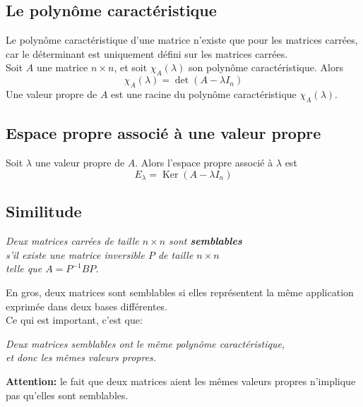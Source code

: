 \documentclass{article}
\numberwithin{equation}{section}
\newcommand\defn{\vspace{4px}\noindent \quad {\large \underline{\textsc{Définition }}: }}
\DeclareMathOperator{\ke}{Ker}
\begin{document}
\subsection{Le polynôme caractéristique}
Le polynôme caractéristique d'une matrice n'existe que pour les matrices carrées, car le déterminant est uniquement défini sur les matrices carrées. \\
Soit \(A\) une matrice \(n \times n\), et soit \(\chi_A(\lambda)\) son polynôme caractéristique. Alors
\begin{equation}
	\chi_A(\lambda) = \det(A-\lambda I_n)
\end{equation}
Une valeur propre de \(A\) est une racine du polynôme caractéristique \(\chi_A(\lambda)\). 

\subsection{Espace propre associé à une valeur propre}
Soit \(\lambda\) une valeur propre de \(A\). Alors l'espace propre associé à \(\lambda\) est
\begin{equation}
	E_\lambda = \ke(A-\lambda I_n)
\end{equation}

\subsection{Similitude}
\defn
\begin{center}
	\emph{Deux matrices carrées de taille \(n \times n\) sont \textbf{semblables} \\ s'il existe une matrice inversible \(P\) de taille \(n \times n\) \\ telle que \(A = P^{-1}BP\).}
\end{center}

En gros, deux matrices sont semblables si elles représentent la même application exprimée dans deux bases différentes. \\
Ce qui est important, c'est que:
\begin{center}
	\emph{Deux matrices semblables ont le même polynôme caractéristique, \\ et donc les mêmes valeurs propres.}
\end{center}
\textbf{Attention:} le fait que deux matrices aient les mêmes valeurs propres n'implique pas qu'elles sont semblables.
\end{document}

